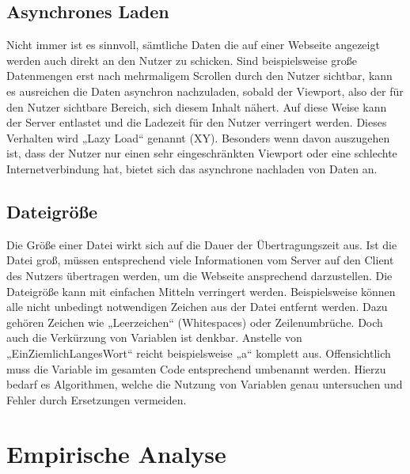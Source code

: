 \subsection{Asynchrones Laden}
\label{sec:Asynchrones Laden}
Nicht immer ist es sinnvoll, sämtliche Daten die auf einer Webseite angezeigt werden auch direkt an den Nutzer zu schicken. Sind beispielsweise große Datenmengen erst nach mehrmaligem Scrollen durch den Nutzer sichtbar, kann es ausreichen die Daten asynchron nachzuladen, sobald der Viewport, also der für den Nutzer sichtbare Bereich, sich diesem Inhalt nähert. Auf diese Weise kann der Server entlastet und die Ladezeit für den Nutzer verringert werden. Dieses Verhalten wird „Lazy Load“ genannt (XY). Besonders wenn davon auszugehen ist, dass der Nutzer nur einen sehr eingeschränkten Viewport oder eine schlechte Internetverbindung hat, bietet sich das asynchrone nachladen von Daten an.


\subsection{Dateigröße}
\label{sec:Dateigroesse}
Die Größe einer Datei wirkt sich auf die Dauer der Übertragungszeit aus. Ist die Datei groß, müssen entsprechend viele Informationen vom Server auf den Client des Nutzers übertragen werden, um die Webseite ansprechend darzustellen. Die Dateigröße kann mit einfachen Mitteln verringert werden. Beispielsweise können alle nicht unbedingt notwendigen Zeichen aus der Datei entfernt werden. Dazu gehören Zeichen wie „Leerzeichen“ (Whitespaces) oder Zeilenumbrüche. Doch auch die Verkürzung von Variablen ist denkbar. Anstelle von „EinZiemlichLangesWort“ reicht beispielsweise „a“ komplett aus. Offensichtlich muss die Variable im gesamten Code entsprechend umbenannt werden. Hierzu bedarf es Algorithmen, welche die Nutzung von Variablen genau untersuchen und Fehler durch Ersetzungen vermeiden.

\section{Empirische Analyse}
\label{sec:Empirische Analyse}
